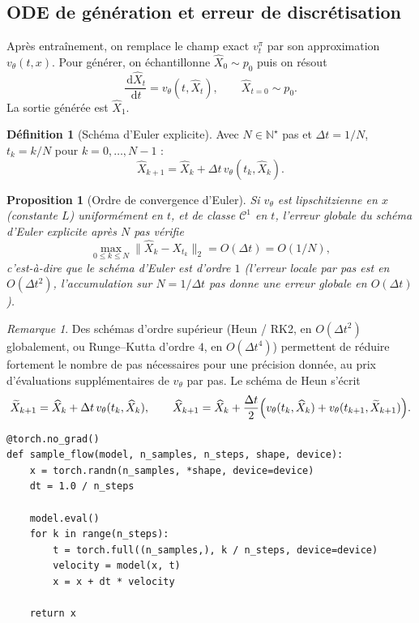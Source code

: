 \documentclass[11pt,a4paper]{article}
\theoremstyle{definition}
\newtheorem{definition}{Définition}[section]
\theoremstyle{plain}
\newtheorem{proposition}{Proposition}[section]
\theoremstyle{remark}
\newtheorem{remark}{Remarque}[section]
\newcommand{\N}{\mathbb{N}}
\newcommand{\dd}{\,\mathrm{d}}
\begin{document}
\subsection{ODE de génération et erreur de discrétisation}

Après entraînement, on remplace le champ exact $v_t^\pi$ par son approximation
$v_\theta(t,x)$. Pour générer, on échantillonne $\widehat X_0\sim p_0$ puis on
résout
\[
  \frac{\dd \widehat X_t}{\dd t} = v_\theta(t,\widehat X_t),
  \qquad \widehat X_{t=0}\sim p_0.
\]
La sortie générée est $\widehat X_1$.

\begin{definition}[Schéma d'Euler explicite]
Avec $N\in\N^\star$ pas et $\Delta t = 1/N$, $t_k=k/N$ pour $k=0,\dots,N-1$ :
\[
  \widehat X_{k+1} = \widehat X_k + \Delta t\,v_\theta(t_k,\widehat X_k).
\]
\end{definition}

\begin{proposition}[Ordre de convergence d'Euler]
Si $v_\theta$ est lipschitzienne en $x$ (constante $L$) uniformément en $t$, et
de classe $\mathcal{C}^1$ en $t$, l'erreur globale du schéma d'Euler explicite
après $N$ pas vérifie
\[
  \max_{0\le k\le N}\|\widehat X_k - X_{t_k}\|_2 = O(\Delta t) = O(1/N),
\]
c'est-à-dire que le schéma d'Euler est d'ordre $1$ (l'erreur locale par pas est
en $O(\Delta t^2)$, l'accumulation sur $N=1/\Delta t$ pas donne une erreur
globale en $O(\Delta t)$).
\end{proposition}

\begin{remark}
Des schémas d'ordre supérieur (Heun / RK2, en $O(\Delta t^2)$ globalement, ou
Runge--Kutta d'ordre $4$, en $O(\Delta t^4)$) permettent de réduire fortement le
nombre de pas nécessaires pour une précision donnée, au prix d'évaluations
supplémentaires de $v_\theta$ par pas. Le schéma de Heun s'écrit
\[
  \widetilde X_{k+1} = \widehat X_k + \Delta t\, v_\theta(t_k,\widehat X_k),
  \qquad
  \widehat X_{k+1} = \widehat X_k + \frac{\Delta t}{2}\Bigl(v_\theta(t_k,\widehat X_k)+v_\theta(t_{k+1},\widetilde X_{k+1})\Bigr).
\]
\end{remark}

\begin{lstlisting}[style=pythoncourse,caption={Simulation Euler d'un flow appris}]
@torch.no_grad()
def sample_flow(model, n_samples, n_steps, shape, device):
    x = torch.randn(n_samples, *shape, device=device)
    dt = 1.0 / n_steps

    model.eval()
    for k in range(n_steps):
        t = torch.full((n_samples,), k / n_steps, device=device)
        velocity = model(x, t)
        x = x + dt * velocity

    return x
\end{lstlisting}
\end{document}
